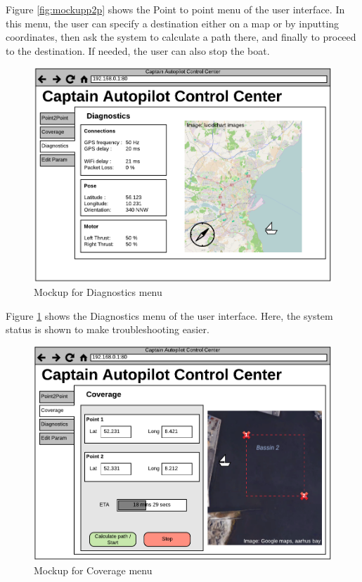 Figure \ref{fig:mockupp2p} shows the Point to point menu of the user interface. In this menu, the user can specify a destination either on a map or by inputting coordinates, then ask the system to calculate a path there, and finally to proceed to the destination. If needed, the user can also stop the boat.

\begin{figure}[H]
	\centering
	\includegraphics[width=1\linewidth]{Images/Requirements_specification/UI_Mockup_Diagnostics.pdf}
	\caption{Mockup for Diagnostics menu}
	\label{fig:mockupdiag}
\end{figure}

Figure \ref{fig:mockupdiag} shows the Diagnostics menu of the user interface. Here, the system status is shown to make troubleshooting easier.

\begin{figure}[H]
	\centering
	\includegraphics[width=1\linewidth]{Images/Requirements_specification/UI_Mockup_Coverage.pdf}
	\caption{Mockup for Coverage menu}
	\label{fig:mockupcover}
\end{figure}

